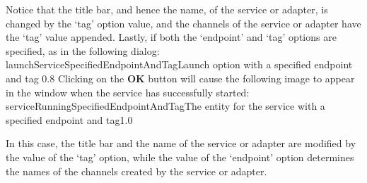 Notice that the title bar, and hence the name, of the service or adapter, is changed by
the `tag' option value, and the channels of the service or adapter have the `tag' value
appended.
Lastly, if both the `endpoint' and `tag' options are specified, as in the following
dialog:
%
{launchServiceSpecifiedEndpointAndTag}{Launch option with a specified endpoint and tag}%
{0.8}
\condPage{}
Clicking on the \textbf{OK} button will cause the following image to appear in the
\emph{\CMU} window when the service has successfully started:
%
{serviceRunningSpecifiedEndpointAndTag}{The \emph{\CMU} entity for the service with a
specified endpoint and tag}{1.0}

In this case, the title bar and the name of the service or adapter are modified by the
value of the `tag' option, while the value of the `endpoint' option determines the names
of the \yarp{} channels created by the service or adapter.
\appendixEnd{}
